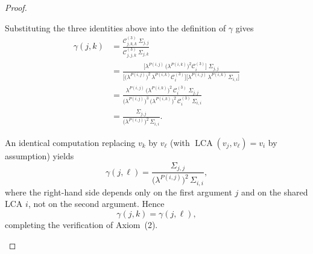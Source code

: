 \documentclass[11pt,a4paper]{article}
\numberwithin{equation}{section}
\begin{document}
\begin{proof}
\begin{enumerate}[label=(\arabic*)]
Substituting the three identities above into the definition of $\gamma$
gives
\begin{align*}
  \gamma(j,k)
  &= \frac{\mathcal{C}^{(3)}_{j,k,k}\;\Sigma_{j,j}}
          {\mathcal{C}^{(3)}_{j,j,k}\;\Sigma_{j,k}}
  \\[6pt]
  &= \frac{\bigl[\lambda^{P(i,j)}\,\bigl(\lambda^{P(i,k)}\bigr)^2
            \mathcal{C}^{(3)}_i\bigr]\;\Sigma_{j,j}}
          {\bigl[\bigl(\lambda^{P(i,j)}\bigr)^2\,\lambda^{P(i,k)}
            \mathcal{C}^{(3)}_i\bigr]
           \bigl[\lambda^{P(i,j)}\,\lambda^{P(i,k)}\,\Sigma_{i,i}\bigr]}
  \\[6pt]
  &= \frac{\lambda^{P(i,j)}\,\bigl(\lambda^{P(i,k)}\bigr)^2\,
           \mathcal{C}^{(3)}_i\;\Sigma_{j,j}}
          {\bigl(\lambda^{P(i,j)}\bigr)^3\,\bigl(\lambda^{P(i,k)}\bigr)^2\,
           \mathcal{C}^{(3)}_i\,\Sigma_{i,i}}
  \\[6pt]
  &= \frac{\Sigma_{j,j}}
          {\bigl(\lambda^{P(i,j)}\bigr)^2\,\Sigma_{i,i}}.
\end{align*}

An identical computation replacing $v_k$ by $v_\ell$ (with
$\operatorname{LCA}(v_j,v_\ell)=v_i$ by assumption) yields
\[
  \gamma(j,\ell)
  = \frac{\Sigma_{j,j}}
         {\bigl(\lambda^{P(i,j)}\bigr)^2\,\Sigma_{i,i}},
\]
where the right-hand side depends only on the first argument $j$ and on
the shared LCA $i$, not on the second argument.  Hence
\[
  \gamma(j,k) = \gamma(j,\ell),
\]
completing the verification of Axiom~(2).


\end{enumerate}
\end{proof}
\end{document}
